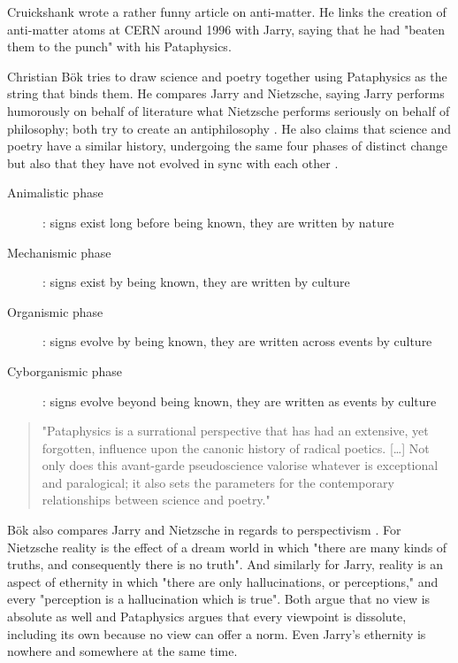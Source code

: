 Cruickshank \citep{Cruickshank} wrote a rather funny article on anti-matter. He links the creation of anti-matter atoms at CERN around 1996 with Jarry, saying that he had "beaten them to the punch" with his Pataphysics.

Christian Bök \citep{Bok2002} tries to draw science and poetry together using Pataphysics as the string that binds them. He compares Jarry and Nietzsche, saying Jarry performs humorously on behalf of literature what Nietzsche performs seriously on behalf of philosophy; both try to create an antiphilosophy \citep[p.9]{Bok2002}. He also claims that science and poetry have a similar history, undergoing the same four phases of distinct change but also that they have not evolved in sync with each other \citep[p.15]{Bok2002}.

\begin{description}
  \item [Animalistic phase]: signs exist long before being known, they are written by nature
  \item	[Mechanismic phase]: signs exist by being known, they are written by culture
  \item [Organismic phase]: signs evolve by being known, they are written across events by culture
  \item	[Cyborganismic phase]: signs evolve beyond being known, they are written as events by culture
\end{description}

\begin{quote}
  "Pataphysics is a surrational perspective that has had an extensive, yet forgotten, influence upon the canonic history of radical poetics. […] Not only does this avant-garde pseudoscience valorise whatever is exceptional and paralogical; it also sets the parameters for the contemporary relationships between science and poetry." \citep[p.27]{Bok2002}
\end{quote}

Bök also compares Jarry and Nietzsche in regards to perspectivism \citep[p.31]{Bok2002}. For Nietzsche reality is the effect of a dream world in which "there are many kinds of truths, and consequently there is no truth". And similarly for Jarry, reality is an aspect of ethernity in which "there are only hallucinations, or perceptions," and every "perception is a hallucination which is true". Both argue that no view is absolute as well and Pataphysics argues that every viewpoint is dissolute, including its own because no view can offer a norm. Even Jarry's ethernity is nowhere and somewhere at the same time.


